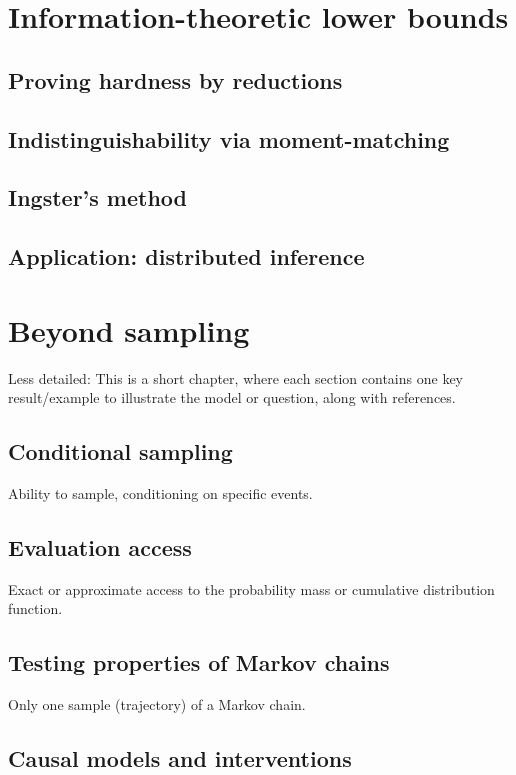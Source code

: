 \documentclass[biber]{nowfnt} %
\begin{document}
\chapter{Information-theoretic lower bounds}
\section{Proving hardness by reductions}
\section{Indistinguishability via moment-matching}
\section{Ingster's method}
\section{Application: distributed inference}

\chapter{Beyond \iid sampling}
Less detailed: This is a short chapter, where each section contains one key result/example
to illustrate the model or question, along with references.

\section{Conditional sampling}
Ability to sample, conditioning on specific events.

\section{Evaluation access}
Exact or approximate access to the probability mass or cumulative
distribution function.

\section{Testing properties of Markov chains}
Only one sample (trajectory) of a Markov chain.

\section{Causal models and interventions}
\end{document}
